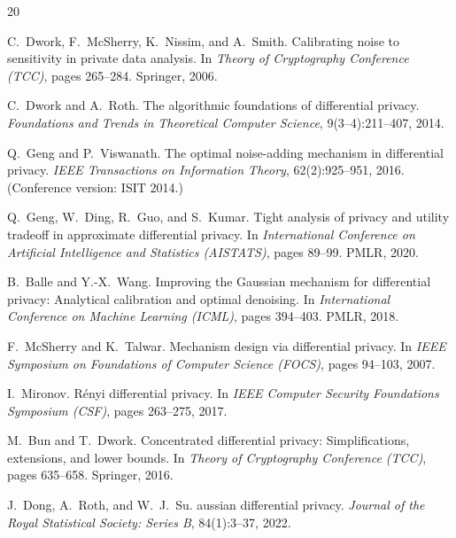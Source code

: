 \documentclass[11pt,a4paper]{article}
\begin{document}

\begin{thebibliography}{20}

C.~Dwork, F.~McSherry, K.~Nissim, and A.~Smith.
\newblock Calibrating noise to sensitivity in private data analysis.
\newblock In \emph{Theory of Cryptography Conference (TCC)}, pages 265--284.
  Springer, 2006.

C.~Dwork and A.~Roth.
\newblock The algorithmic foundations of differential privacy.
\newblock \emph{Foundations and Trends in Theoretical Computer Science},
  9(3--4):211--407, 2014.

Q.~Geng and P.~Viswanath.
\newblock The optimal noise-adding mechanism in differential privacy.
\newblock \emph{IEEE Transactions on Information Theory}, 62(2):925--951, 2016.
\newblock (Conference version: ISIT 2014.)

Q.~Geng, W.~Ding, R.~Guo, and S.~Kumar.
\newblock Tight analysis of privacy and utility tradeoff in approximate
  differential privacy.
\newblock In \emph{International Conference on Artificial Intelligence and
  Statistics (AISTATS)}, pages 89--99. PMLR, 2020.

B.~Balle and Y.-X.~Wang.
\newblock Improving the {G}aussian mechanism for differential privacy: Analytical
  calibration and optimal denoising.
\newblock In \emph{International Conference on Machine Learning (ICML)}, pages
  394--403. PMLR, 2018.

F.~McSherry and K.~Talwar.
\newblock Mechanism design via differential privacy.
\newblock In \emph{IEEE Symposium on Foundations of Computer Science (FOCS)},
  pages 94--103, 2007.

I.~Mironov.
\newblock R\'enyi differential privacy.
\newblock In \emph{IEEE Computer Security Foundations Symposium (CSF)},
  pages 263--275, 2017.

M.~Bun and T.~Dwork.
\newblock Concentrated differential privacy: Simplifications, extensions, and
  lower bounds.
\newblock In \emph{Theory of Cryptography Conference (TCC)}, pages 635--658.
  Springer, 2016.

J.~Dong, A.~Roth, and W.~J.~Su.
aussian differential privacy.
\newblock \emph{Journal of the Royal Statistical Society: Series B},
  84(1):3--37, 2022.


\end{thebibliography}
\end{document}

